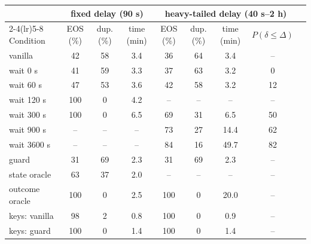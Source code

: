 \begin{tabular}{lcccccccc}
\toprule
 & \multicolumn{3}{c}{fixed delay (90 s)} & \multicolumn{4}{c}{heavy-tailed delay (40 s--2 h)} \\
\cmidrule(lr){2-4}\cmidrule(lr){5-8}
Condition & EOS (\%) & dup. (\%) & time (min) & EOS (\%) & dup. (\%) & time (min) & $P(\delta\le\Delta)$ \\
\midrule
vanilla & 42 & 58 & 3.4 & 36 & 64 & 3.4 & -- \\
wait 0 s & 41 & 59 & 3.3 & 37 & 63 & 3.2 & 0 \\
wait 60 s & 47 & 53 & 3.6 & 42 & 58 & 3.2 & 12 \\
wait 120 s & 100 & 0 & 4.2 & -- & -- & -- & -- \\
wait 300 s & 100 & 0 & 6.5 & 69 & 31 & 6.5 & 50 \\
\midrule
wait 900 s & -- & -- & -- & 73 & 27 & 14.4 & 62 \\
wait 3600 s & -- & -- & -- & 84 & 16 & 49.7 & 82 \\
\midrule
guard & 31 & 69 & 2.3 & 31 & 69 & 2.3 & -- \\
state oracle & 63 & 37 & 2.0 & -- & -- & -- & -- \\
outcome oracle & 100 & 0 & 2.5 & 100 & 0 & 20.0 & -- \\
\midrule
keys: vanilla & 98 & 2 & 0.8 & 100 & 0 & 0.9 & -- \\
keys: guard & 100 & 0 & 1.4 & 100 & 0 & 1.4 & -- \\
\bottomrule
\end{tabular}